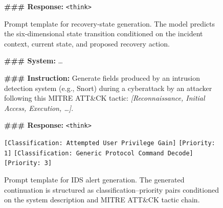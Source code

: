 \documentclass[sigconf]{acmart}
\begin{document}
\begin{figure}
\begin{tcolorbox}[
  title=Local-State Generation Prompt Template,
  colback=bluetwo!10,
  colframe=bluetwo,
  boxrule=0.5pt,
  arc=2pt,
  left=5pt,
  right=5pt,
  top=5pt,
  bottom=5pt]
\textbf{\#\#\# Response:}
\texttt{<think>}
\end{tcolorbox}
\caption{Prompt template for recovery-state generation. The model predicts the six-dimensional state transition conditioned on the incident context, current state, and proposed recovery action.}
\label{fig:state-prompt}
\end{figure}

\begin{figure}
\centering
\begin{tcolorbox}[
  title=IDS Alert Generation Prompt Template,
  colback=Orange!8,
  colframe=Orange!70,
  boxrule=0.5pt,
  arc=2pt,
  left=5pt,
  right=5pt,
  top=5pt,
  bottom=5pt]
\footnotesize
\textbf{\#\#\# System:} \ldots

\textbf{\#\#\# Instruction:}
Generate fields produced by an intrusion detection system (e.g., Snort)
during a cyberattack by an attacker following this MITRE ATT\&CK tactic:
\emph{[Reconnaissance, Initial Access, Execution, \ldots]}.

\textbf{\#\#\# Response:}
\texttt{<think>}

\texttt{[Classification: Attempted User Privilege Gain]}
\texttt{[Priority: 1]}
\texttt{[Classification: Generic Protocol Command Decode]}
\texttt{[Priority: 3]}

\end{tcolorbox}
\caption{Prompt template for IDS alert generation. The generated continuation
is structured as classification--priority pairs conditioned on the system
description and MITRE ATT\&CK tactic chain.}
\label{fig:alert-prompt}
\end{figure}
\end{document}
